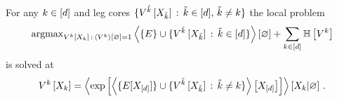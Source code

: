 \begin{theorem}
    For any $k\in[d]$ and leg cores $\{V^{\tilde{k}}\left[X_{\tilde{k}}\right] \, : \, \tilde{k}\in[d],\,\tilde{k}\neq k\}$ the local problem
    \begin{align*}
        \mathrm{argmax}_{V^{k}\left[X_{k}\right] \, : \, \left\langle V^{k}\right\rangle \left[ \varnothing \right]=1} \left\langle \{E\} \cup \{V^{\tilde{k}}\left[X_{\tilde{k}}\right] \, : \, \tilde{k}\in[d]\}\right\rangle \left[ \varnothing \right]
        + \sum_{k\in[d]} \mathbb{H}\left[V^{k}\right]
    \end{align*}
    is solved at
    \begin{align*}
        V^{k}\left[X_{k}\right]
        = \left\langle  \mathrm{exp}\left[ \left\langle  \{E[X_{[d]}] \}\cup
        \{V^{\tilde{k}}\left[X_{\tilde{k}}\right] \, : \, \tilde{k}\neq k\} \right\rangle \left[ X_{[d]} \right] \right]
        \right\rangle \left[ X_{k} | \varnothing \right] \, .
    \end{align*}
\end{theorem}
